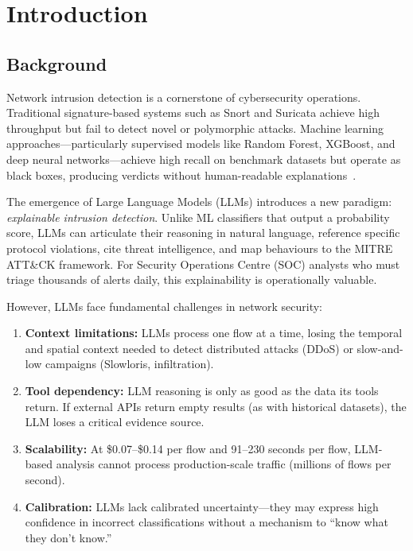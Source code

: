 \documentclass[12pt, a4paper, oneside]{report}
\begin{document}
\chapter{Introduction}
\label{ch:introduction}

\section{Background}
\label{sec:background}

Network intrusion detection is a cornerstone of cybersecurity operations.
Traditional signature-based systems such as Snort and
Suricata achieve high throughput but fail to detect novel or
polymorphic attacks. Machine learning approaches---particularly supervised models
like Random Forest, XGBoost, and deep neural networks---achieve high recall on
benchmark datasets but operate as black boxes, producing verdicts without
human-readable explanations~\cite{zhang2024survey, ferrag2024generative}.

The emergence of Large Language Models (LLMs) introduces a new paradigm:
\emph{explainable intrusion detection}. Unlike ML classifiers that output a
probability score, LLMs can articulate their reasoning in natural language,
reference specific protocol violations, cite threat intelligence, and map
behaviours to the MITRE ATT\&CK framework. For Security Operations Centre
(SOC) analysts who must triage thousands of alerts daily, this explainability
is operationally valuable.

However, LLMs face fundamental challenges in network security:
\begin{enumerate}
  \item \textbf{Context limitations:} LLMs process one flow at a time, losing
        the temporal and spatial context needed to detect distributed attacks
        (DDoS) or slow-and-low campaigns (Slowloris, infiltration).
  \item \textbf{Tool dependency:} LLM reasoning is only as good as the data
        its tools return. If external APIs return empty results (as with
        historical datasets), the LLM loses a critical evidence source.
  \item \textbf{Scalability:} At \$0.07--\$0.14 per flow and 91--230 seconds
        per flow, LLM-based analysis cannot process production-scale traffic
        (millions of flows per second).
  \item \textbf{Calibration:} LLMs lack calibrated uncertainty---they may
        express high confidence in incorrect classifications without a
        mechanism to ``know what they don't know.''
\end{enumerate}
\end{document}
